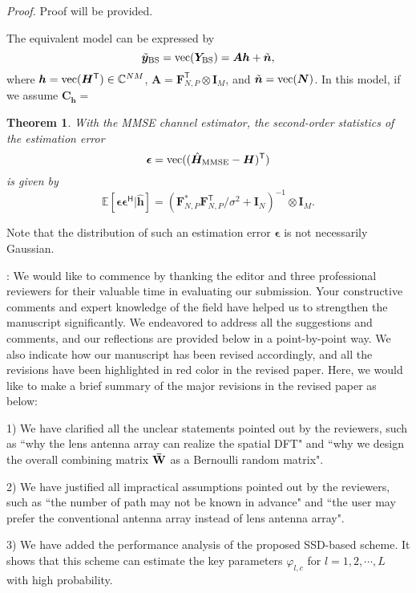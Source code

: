 \documentclass[a4paper,12pt]{article}
\newtheorem{theorem}{\bf Theorem}
\def \T {^{\mathsf{T}}}
\def \H {^{\mathsf{H}}}
\begin{document}
{\it Proof.}
Proof will be provided. 

The equivalent model can be expressed by 
\begin{equation}
    \tilde{\bm y}_{\rm BS} = {\rm vec}({\bm Y}_{\rm BS}) = {\bm A}{\bm h} + \tilde{\bm n},
\end{equation}
where ${\bm h} = {\rm vec}({\bm H}\T)\in\mathbb{C}^{NM}$, ${\bm A} = {\bm F}_{N,P}\T\otimes {\bm I}_M$, and $\tilde{\bm n} = {\rm vec}({\bm N})$. In this model, if we assume ${\bm C}_{\bm h} = $ 

\begin{theorem}
    With the MMSE channel estimator, the second-order statistics of the estimation error 
    \begin{equation}
        {\bm \epsilon} = {\rm vec}((\hat{{\bm H}}_{\rm MMSE} - {\bm H})\T)  
    \end{equation}
    is given by 
    \begin{equation}
        \mathbb{E}[{\bm \epsilon}{\bm \epsilon}\H | \hat{\bm h}] = \left( {\bm F}_{N,P}^{*} {\bm F_{N,P}\T / \sigma^2 + {\bm I}_N} \right)^{-1} \otimes {\bm I}_M.
    \end{equation}
\end{theorem}

Note that the distribution of such an estimation error ${\bm \epsilon}$ is not necessarily Gaussian. 



{: We would like to commence by thanking the editor and three professional reviewers for their valuable time in evaluating our submission. Your constructive comments and expert knowledge of the field have helped us to strengthen the manuscript significantly. We endeavored to address all the suggestions and comments, and our reflections are provided below in a point-by-point way. We also indicate how our manuscript has been revised accordingly, and all the revisions have been highlighted in {\color{red} red} color in the revised paper. Here, we would like to make a brief summary of the major revisions in the revised paper as below:

1) We have clarified all the unclear statements pointed out by the reviewers, such as ``why the lens antenna array can realize the spatial DFT" and ``why we design the overall combining matrix ${{{\bf{\bar W}}}}$ as a Bernoulli random matrix".

2) We have justified all impractical assumptions pointed out by the reviewers, such as ``the number of path may not be known in advance" and ``the user may prefer the conventional antenna array instead of lens antenna array".

3) We have added the performance analysis of the proposed SSD-based scheme. It shows that this scheme can estimate the key parameters ${{\varphi _{l,c}}}$ for ${l = 1,2, \cdots ,L}$ with high probability.
}
\end{document}
